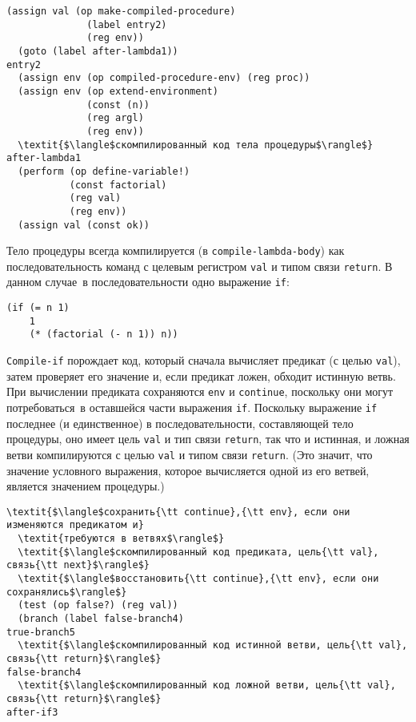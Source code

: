 \begin{Verbatim}[fontsize=\small]
  (assign val (op make-compiled-procedure)
              (label entry2)
              (reg env))
  (goto (label after-lambda1))
entry2
  (assign env (op compiled-procedure-env) (reg proc))
  (assign env (op extend-environment)
              (const (n))
              (reg argl)
              (reg env))
  \textit{$\langle$скомпилированный код тела процедуры$\rangle$}
after-lambda1
  (perform (op define-variable!)
           (const factorial)
           (reg val)
           (reg env))
  (assign val (const ok))
\end{Verbatim}

Тело процедуры всегда компилируется (в
{\tt compile-lambda-body}) как последовательность команд с
целевым регистром {\tt val} и типом связи {\tt return}.
В данном случае~в последовательности одно выражение {\tt if}:

\begin{Verbatim}[fontsize=\small]
(if (= n 1)
    1
    (* (factorial (- n 1)) n))
\end{Verbatim}
{\tt Compile-if} порождает код, который сначала  вычисляет
предикат (с целью {\tt val}), затем проверяет его значение и,
если предикат ложен, обходит истинную ветвь.  При вычислении предиката
сохраняются {\tt env} и {\tt continue}, поскольку они
могут потребоваться~в оставшейся части выражения {\tt if}.
Поскольку выражение {\tt if} последнее (и единственное) в
последовательности, составляющей тело процедуры, оно имеет цель
{\tt val} и тип связи {\tt return}, так что и истинная,
и ложная ветви компилируются с целью {\tt val} и типом связи
{\tt return}.  (Это значит, что значение условного выражения,
которое вычисляется одной из его ветвей,  является значением
процедуры.)

\begin{Verbatim}[fontsize=\small]
  \textit{$\langle$сохранить{\tt continue},{\tt env}, если они изменяются предикатом и}
  \textit{требуются в ветвях$\rangle$}
  \textit{$\langle$скомпилированный код предиката, цель{\tt val}, связь{\tt next}$\rangle$}
  \textit{$\langle$восстановить{\tt continue},{\tt env}, если они сохранялись$\rangle$}
  (test (op false?) (reg val))
  (branch (label false-branch4)
true-branch5
  \textit{$\langle$скомпилированный код истинной ветви, цель{\tt val}, связь{\tt return}$\rangle$}
false-branch4
  \textit{$\langle$скомпилированный код ложной ветви, цель{\tt val}, связь{\tt return}$\rangle$}
after-if3
\end{Verbatim}


